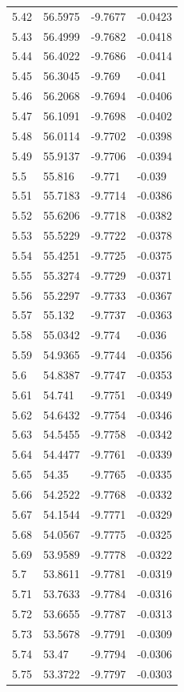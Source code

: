 \begin{tabular}{llll}
5.42 & 56.5975 & -9.7677 & -0.0423 \\
5.43 & 56.4999 & -9.7682 & -0.0418 \\
5.44 & 56.4022 & -9.7686 & -0.0414 \\
5.45 & 56.3045 & -9.769 & -0.041 \\
5.46 & 56.2068 & -9.7694 & -0.0406 \\
5.47 & 56.1091 & -9.7698 & -0.0402 \\
5.48 & 56.0114 & -9.7702 & -0.0398 \\
5.49 & 55.9137 & -9.7706 & -0.0394 \\
5.5 & 55.816 & -9.771 & -0.039 \\
5.51 & 55.7183 & -9.7714 & -0.0386 \\
5.52 & 55.6206 & -9.7718 & -0.0382 \\
5.53 & 55.5229 & -9.7722 & -0.0378 \\
5.54 & 55.4251 & -9.7725 & -0.0375 \\
5.55 & 55.3274 & -9.7729 & -0.0371 \\
5.56 & 55.2297 & -9.7733 & -0.0367 \\
5.57 & 55.132 & -9.7737 & -0.0363 \\
5.58 & 55.0342 & -9.774 & -0.036 \\
5.59 & 54.9365 & -9.7744 & -0.0356 \\
5.6 & 54.8387 & -9.7747 & -0.0353 \\
5.61 & 54.741 & -9.7751 & -0.0349 \\
5.62 & 54.6432 & -9.7754 & -0.0346 \\
5.63 & 54.5455 & -9.7758 & -0.0342 \\
5.64 & 54.4477 & -9.7761 & -0.0339 \\
5.65 & 54.35 & -9.7765 & -0.0335 \\
5.66 & 54.2522 & -9.7768 & -0.0332 \\
5.67 & 54.1544 & -9.7771 & -0.0329 \\
5.68 & 54.0567 & -9.7775 & -0.0325 \\
5.69 & 53.9589 & -9.7778 & -0.0322 \\
5.7 & 53.8611 & -9.7781 & -0.0319 \\
5.71 & 53.7633 & -9.7784 & -0.0316 \\
5.72 & 53.6655 & -9.7787 & -0.0313 \\
5.73 & 53.5678 & -9.7791 & -0.0309 \\
5.74 & 53.47 & -9.7794 & -0.0306 \\
5.75 & 53.3722 & -9.7797 & -0.0303 \\

\end{tabular}
